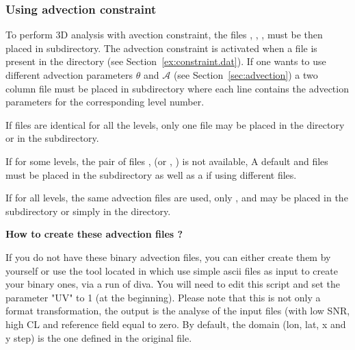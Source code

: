 \subsubsection{Using advection constraint\label{advconstuse}}

To perform 3D analysis with avection constraint, the files ,\linebreak
{}, , must be then placed in  subdirectory. 
The advection constraint is activated when a  file is present in the  directory 
(see Section~\ref{ex:constraint.dat}). If one wants to use different advection parameters $\theta$ and $\mathcal{A}$ 
(see Section~\ref{sec:advection}) a two column  file must be placed in  
subdirectory where each line contains the advection parameters for the corresponding level number.

If  files are identical for all the levels, only one file  may be placed in the 
directory or in the  subdirectory.

If for some levels, the pair of files ,  (or ,
) is not available, A default  and  files must be placed in the
 subdirectory as well as a  if using different  files.

If for all levels, the same advection files are used, only ,  and  
may be placed in the  subdirectory or simply in the  directory.

\textbf{How to create these advection files ?}

If you do not have these binary advection files, you can either create them by yourself or use the tool 
located in  which use simple ascii files as input to create your binary ones, via a run of diva. You will 
need to edit this script and set the parameter "UV" to 1 (at the beginning). Please note that this is not only
a format transformation, the output is the analyse of the input files (with low SNR, high CL and reference field
equal to zero. By default, the domain (lon, lat, x and y step) is the one defined in the
original  file.

